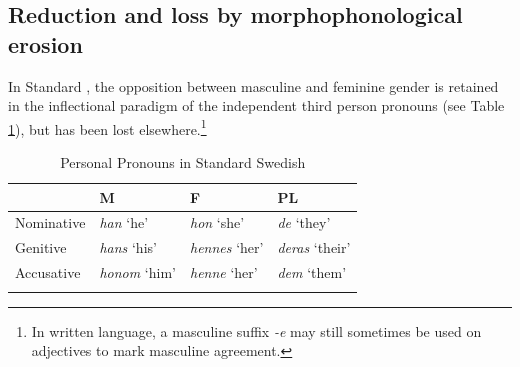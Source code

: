 \documentclass[output=collectionpaper]{langsci/langscibook}
\begin{document}
\subsection{Reduction and loss by morphophonological erosion}
\label{subsubsec:deflection}
In Standard , the opposition between masculine and feminine gender is retained in the inflectional paradigm of the independent third person pronouns (see Table \ref{tab:3:Swedish}), but has been lost elsewhere.\footnote{In written language, a masculine suffix \textit{-e} may still sometimes be used on adjectives to mark masculine agreement.}

 \begin{table}
\caption{Personal Pronouns in Standard Swedish}
\label{tab:3:Swedish}
 \begin{tabular}{llll} %
  \lsptoprule
&  M    & F & PL \\ %
  \midrule
Nominative & \textit{han} `he' & \textit{hon} `she' & \textit{de} `they'\\
Genitive & \textit{hans} `his' &  \textit{hennes} `her' & \textit{deras} `their'\\
Accusative &\textit{honom} `him'  & \textit{henne} `her' & \textit{dem} `them'\\
  \lspbottomrule
 \end{tabular}
\end{table}
\end{document}
